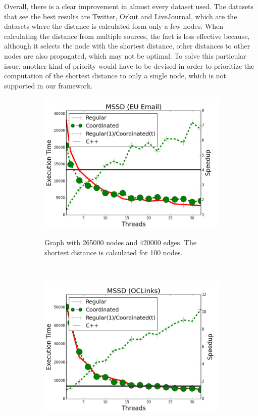 Overall, there is a clear improvement in almost every dataset used. The datasets
that see the best results are Twitter, Orkut and LiveJournal, which are the
datasets where the distance is calculated form only a few nodes. When
calculating the distance from multiple sources, the  fact
is less effective because, although it selects the node with the shortest
distance, other distances to other nodes are also propagated, which may not be
optimal. To solve this particular issue, another kind of priority would have to
be devised in order to prioritize the computation of the shortest distance to
only a single node, which is not supported in our framework.

\begin{figure}[]
        \centering
        \begin{subfigure}[b]{\plotsize\textwidth}
                \includegraphics[width=\textwidth]{experiments/coordination/cmp-shortest-email.png}
                \label{fig:coordination:coord_sssp_email}
                \caption{Graph with 265000 nodes and 420000 edges. The shortest
                distance is calculated for 100 nodes.}
        \end{subfigure}
        ~
        \begin{subfigure}[b]{\plotsize\textwidth}
                \includegraphics[width=\textwidth]{experiments/coordination/cmp-shortest-oclinks.png}

\end{subfigure}
\end{figure}
